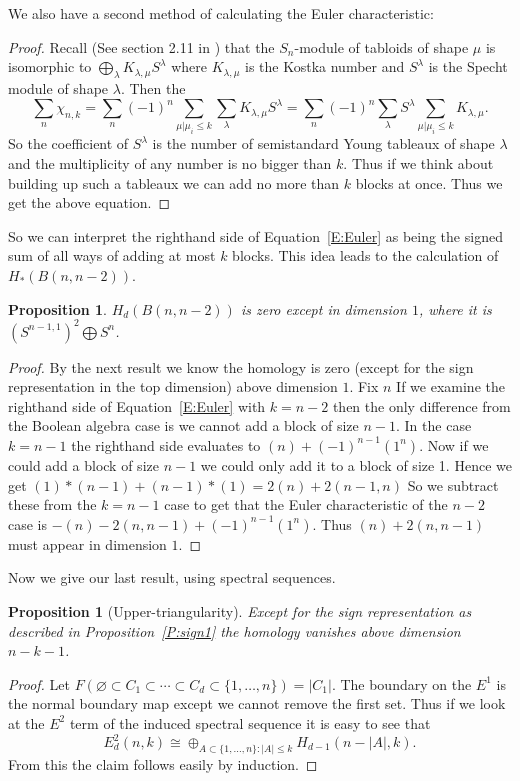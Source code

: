 \documentclass{amsart}
\newtheorem{proposition}[theorem]{Proposition}
\newcommand{\full}{\{1, \ldots, n\}}
\begin{document}
We also have a second method of calculating the Euler characteristic:
 \begin{proof} 
    Recall (See section 2.11 in \cite{Sagan}) that the $S_n$-module of 
    tabloids of shape $\mu$ is isomorphic to $\bigoplus_{\lambda} K_{\lambda, \mu} S^\lambda$ where $K_{\lambda, \mu}$
    is the Kostka number and $S^\lambda$ is the Specht module of shape $\lambda$. Then the $$\sum_n \chi_{n, k} = 
    \sum_n (-1)^n \sum_{\mu| \mu_i \le k} \sum_\lambda K_{\lambda, \mu} S^\lambda = \sum_n (-1)^n \sum_\lambda 
    S^\lambda \sum_{\mu | \mu_i \le k} K_{\lambda, \mu}.$$ So the coefficient of $S^\lambda$ is the number of semistandard 
    Young tableaux of shape $\lambda$ and the multiplicity of any number is no bigger than $k$. Thus if we think about 
    building up such a tableaux we can add no more than $k$ blocks at once. Thus we get the above equation. 
  \end{proof}

So we can interpret the righthand side of Equation~\ref{E:Euler} as being the signed sum of all ways of adding at most $k$ 
blocks. This idea leads to the calculation of $H_*(B(n, n-2))$.

\begin{proposition} $H_d(B(n, n-2))$ is zero except in dimension $1$, where it is $(S^{n-1, 1})^2 \bigoplus S^n$.
\end{proposition}
\begin{proof}
  By the next result we know the homology is zero (except for the sign representation in the top dimension) above dimension
  $1$. Fix $n$ If we examine the righthand side of Equation~\ref{E:Euler} with $k=n-2$ then the only difference from the 
  Boolean algebra case is we cannot add a block of size $n-1$. In the case $k=n-1$ the righthand side evaluates to 
  $(n) + (-1)^{n-1} (1^n)$. Now if we could add a block of size $n-1$ we could only add it to a block of size 1. Hence we 
  get $(1)*(n-1) + (n-1)*(1) = 2(n) + 2(n-1, n)$ So we subtract these from the $k=n-1$ case to get that the Euler 
  characteristic of the $n-2$ case is $-(n) -2(n,n-1) + (-1)^{n-1}(1^n)$. Thus $(n)+2(n, n-1)$ must appear in dimension
  $1$. 
\end{proof}

Now we give our last result, using spectral sequences. 
\begin{proposition}[Upper-triangularity] \label{P:uppertri} Except for the sign representation as described in Proposition~\ref{P:sign1} the 
  homology vanishes above dimension $n-k-1$. 
\end{proposition}
\begin{proof}
  Let $F(\varnothing \subset C_1 \subset \cdots \subset C_d \subset \{1, \ldots, n\}) = |C_1|$. The boundary on the
  $E^1$ is the normal boundary map except we cannot remove the first set. Thus if we look at the $E^2$
  term of the induced spectral sequence it is easy to see that 
  \begin{equation} E_d^2(n, k) \cong \oplus_{A \subset \full \colon |A| \le k} H_{d-1}(n-|A|, k).
  \end{equation}
  From this the claim follows easily by induction.
\end{proof}
\end{document}
